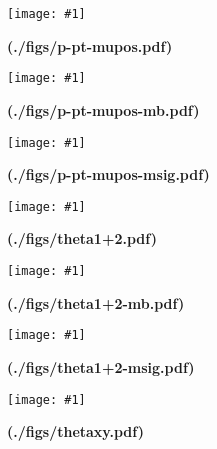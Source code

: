\documentclass{article}
\newcommand{\addfig}[3]{
\begin{figure}[h!]
\begin{center}
\texttt{[image: \#1]}
\caption{#3   \textbf{(#1)}}
\end{center}
\end{figure}
}
\begin{document}
\clearpage\newpage
\addfig{./figs/p-pt-mupos.pdf}{0.9}{}
\clearpage\newpage
\addfig{./figs/p-pt-mupos-mb.pdf}{0.9}{}
\clearpage\newpage
\addfig{./figs/p-pt-mupos-msig.pdf}{0.9}{}
 
\clearpage\newpage
\addfig{./figs/theta1+2.pdf}{0.9}{}
\clearpage\newpage
\addfig{./figs/theta1+2-mb.pdf}{0.9}{}
\clearpage\newpage
\addfig{./figs/theta1+2-msig.pdf}{0.9}{}
 
\clearpage\newpage
\addfig{./figs/thetaxy.pdf}{0.9}{}
 
\end{document}
